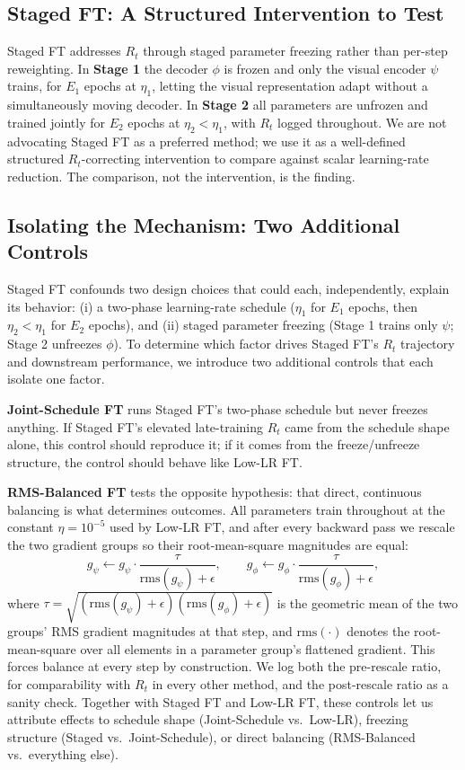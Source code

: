 \documentclass[journal]{IEEEtran}
\begin{document}
\subsection{Staged FT: A Structured Intervention to Test}
\label{sec:damf}
Staged FT addresses $R_t$ through staged parameter freezing rather
than per-step reweighting. In \textbf{Stage 1} the decoder $\phi$ is
frozen and only the visual encoder $\psi$ trains, for $E_1$ epochs at
$\eta_1$, letting the visual representation adapt without a
simultaneously moving decoder. In \textbf{Stage 2} all parameters are
unfrozen and trained jointly for $E_2$ epochs at $\eta_2 < \eta_1$,
with $R_t$ logged throughout. We are not advocating Staged FT as a
preferred method; we use it as a well-defined structured
$R_t$-correcting intervention to compare against scalar learning-rate
reduction. The comparison, not the intervention, is the finding.

\subsection{Isolating the Mechanism: Two Additional Controls}
\label{sec:ablation-controls}
Staged FT confounds two design choices that could each, independently, explain its behavior: (i) a two-phase learning-rate schedule ($\eta_1$ for $E_1$ epochs, then $\eta_2 < \eta_1$ for $E_2$ epochs), and (ii) staged parameter freezing (Stage 1 trains only $\psi$;
Stage 2 unfreezes $\phi$). To determine which factor drives Staged
FT's $R_t$ trajectory and downstream performance, we introduce two
additional controls that each isolate one factor.

\textbf{Joint-Schedule FT} runs Staged FT's two-phase schedule but
never freezes anything. If Staged FT's elevated late-training $R_t$
came from the schedule shape alone, this control should reproduce it;
if it comes from the freeze/unfreeze structure, the control should
behave like Low-LR FT.

\textbf{RMS-Balanced FT} tests the opposite hypothesis: that direct,
continuous balancing is what determines outcomes. All parameters train
throughout at the constant $\eta = 10^{-5}$ used by Low-LR FT, and
after every backward pass we rescale the two gradient groups so their
root-mean-square magnitudes are equal:
\begin{equation}
g_\psi \leftarrow g_\psi \cdot \frac{\tau}{\mathrm{rms}(g_\psi) + \epsilon},
\qquad
g_\phi \leftarrow g_\phi \cdot \frac{\tau}{\mathrm{rms}(g_\phi) + \epsilon},
\label{eq:rms-balance}
\end{equation}
where $\tau = \sqrt{(\mathrm{rms}(g_\psi) + \epsilon)(\mathrm{rms}(g_\phi) + \epsilon)}$
is the geometric mean of the two groups' RMS gradient magnitudes at
that step, and $\mathrm{rms}(\cdot)$ denotes the root-mean-square
over all elements in a parameter group's flattened gradient. This
forces balance at every step by construction. We log both the
pre-rescale ratio, for comparability with $R_t$ in every other method,
and the post-rescale ratio as a sanity check. Together with Staged FT
and Low-LR FT, these controls let us attribute effects to schedule
shape (Joint-Schedule vs.\ Low-LR), freezing structure (Staged
vs.\ Joint-Schedule), or direct balancing (RMS-Balanced
vs.\ everything else).
\end{document}
